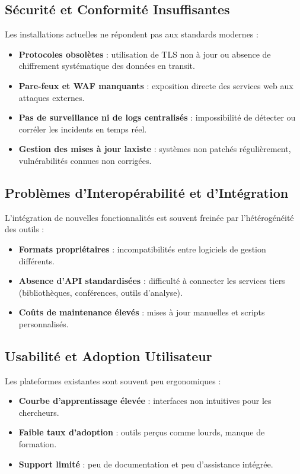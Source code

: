 \documentclass[12pt]{rapportPfe}
\begin{document}
\subsection{Sécurité et Conformité Insuffisantes}
Les installations actuelles ne répondent pas aux standards modernes :
\begin{itemize}[itemsep=1em]
  \item \textbf{Protocoles obsolètes} : utilisation de TLS non à jour ou absence de chiffrement systématique des données en transit.
  \item \textbf{Pare-feux et WAF manquants} : exposition directe des services web aux attaques externes.
  \item \textbf{Pas de surveillance ni de logs centralisés} : impossibilité de détecter ou corréler les incidents en temps réel.
  \item \textbf{Gestion des mises à jour laxiste} : systèmes non patchés régulièrement, vulnérabilités connues non corrigées.
\end{itemize}

\subsection{Problèmes d’Interopérabilité et d’Intégration}
L’intégration de nouvelles fonctionnalités est souvent freinée par l’hétérogénéité des outils :
\begin{itemize}[itemsep=1em]
  \item \textbf{Formats propriétaires} : incompatibilités entre logiciels de gestion différents.
  \item \textbf{Absence d’API standardisées} : difficulté à connecter les services tiers (bibliothèques, conférences, outils d’analyse).
  \item \textbf{Coûts de maintenance élevés} : mises à jour manuelles et scripts personnalisés.
\end{itemize}

\subsection{Usabilité et Adoption Utilisateur}
Les plateformes existantes sont souvent peu ergonomiques :
\begin{itemize}[itemsep=1em]
  \item \textbf{Courbe d’apprentissage élevée} : interfaces non intuitives pour les chercheurs.
  \item \textbf{Faible taux d’adoption} : outils perçus comme lourds, manque de formation.
  \item \textbf{Support limité} : peu de documentation et peu d’assistance intégrée.
\end{itemize}
\end{document}
